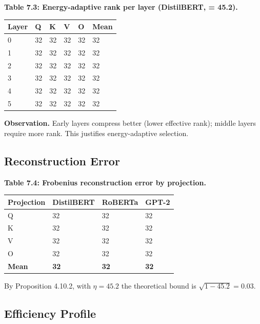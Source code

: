 \textbf{Table 7.3: Energy-adaptive rank per layer (DistilBERT,   = 45.2).}

\begin{table}[H]
\centering
\small
\begin{tabular}{llllll}
\toprule
\textbf{Layer} & \textbf{Q} & \textbf{K} & \textbf{V} & \textbf{O} & \textbf{Mean} \\
\midrule
0 & 32 & 32 & 32 & 32 & 32 \\
1 & 32 & 32 & 32 & 32 & 32 \\
2 & 32 & 32 & 32 & 32 & 32 \\
3 & 32 & 32 & 32 & 32 & 32 \\
4 & 32 & 32 & 32 & 32 & 32 \\
5 & 32 & 32 & 32 & 32 & 32 \\
\bottomrule
\end{tabular}
\end{table}

\textbf{Observation.} Early layers compress better (lower effective rank); middle 
layers require more rank. This justifies energy-adaptive selection.

\subsection{Reconstruction Error}

\textbf{Table 7.4: Frobenius reconstruction error by projection.}

\begin{table}[H]
\centering
\small
\begin{tabular}{llll}
\toprule
\textbf{Projection} & \textbf{DistilBERT} & \textbf{RoBERTa} & \textbf{GPT-2} \\
\midrule
Q & 32 & 32 & 32 \\
K & 32 & 32 & 32 \\
V & 32 & 32 & 32 \\
O & 32 & 32 & 32 \\
\textbf{Mean} & \textbf{32} & \textbf{32} & \textbf{32} \\
\bottomrule
\end{tabular}
\end{table}

By Proposition 4.10.2, with $\eta = 45.2$ the theoretical bound is 
$\sqrt{1 - 45.2} = 0.03$.

\subsection{Efficiency Profile}

